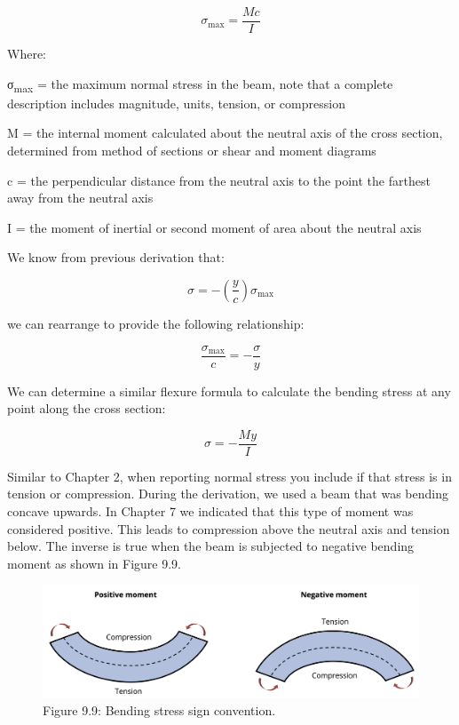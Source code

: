 \documentclass[
  letterpaper,
  DIV=11,
  numbers=noendperiod]{scrreprt}
\begin{document}
\[
\sigma_{\max }=\frac{M c}{I}
\]

Where:

σ\textsubscript{max} = the maximum normal stress in the beam, note that
a complete description includes magnitude, units, tension, or
compression

M = the internal moment calculated about the neutral axis of the cross
section, determined from method of sections or shear and moment diagrams

c = the perpendicular distance from the neutral axis to the point the
farthest away from the neutral axis

I = the moment of inertial or second moment of area about the neutral
axis

We know from previous derivation that:

\[
\sigma=-\left(\frac{y}{c}\right) \sigma_{\max }
\]

we can rearrange to provide the following relationship:

\[
\frac{\sigma_{\max }}{c}=-\frac{\sigma}{y}
\]

We can determine a similar flexure formula to calculate the bending
stress at any point along the cross section:

\[
\sigma=-\frac{M y}{I}
\]

Similar to Chapter 2, when reporting normal stress you include if that
stress is in tension or compression. During the derivation, we used a
beam that was bending concave upwards. In Chapter 7 we indicated that
this type of moment was considered positive. This leads to compression
above the neutral axis and tension below. The inverse is true when the
beam is subjected to negative bending moment as shown in Figure 9.9.

\begin{figure}[H]

{\centering \includegraphics[width=5.19792in,height=\textheight]{images/CH9 PNGs/Figure 9.9.png}

}

\caption{Figure 9.9: Bending stress sign convention.}

\end{figure}%
\end{document}
